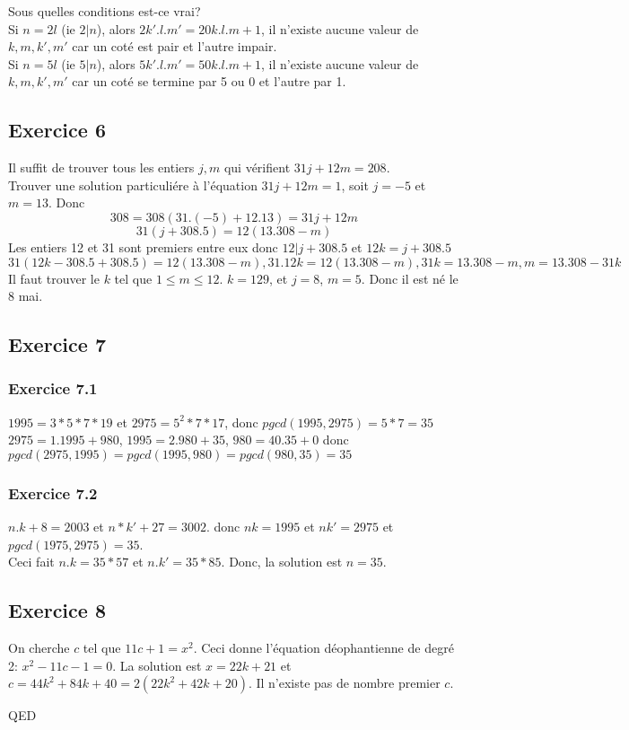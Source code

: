 \documentclass[]{book}
\theoremstyle{definition}
\begin{document}
Sous quelles conditions est-ce vrai?\\
Si $n=2l$ (ie $2|n$), alors $2k'.l.m' = 20k.l.m+1$, il n'existe aucune valeur de $k,m,k',m'$ car un cot\'e est pair et l'autre impair.\\
Si $n=5l$ (ie $5|n$), alors $5k'.l.m' = 50k.l.m+1$, il n'existe aucune valeur de $k,m,k',m'$ car un cot\'e se termine par 5 ou 0 et l'autre par 1.\\


\subsection*{Exercice 6}
Il suffit de trouver tous les entiers $j,m$ qui v\'erifient $31j+12m=208$.\\
Trouver une solution particuli\'ere \`a l'\'equation $31j+12m=1$, soit $j=-5$ et $m=13$. Donc 
$$308 = 308(31.(-5) + 12.13) =  31j + 12m$$
$$31(j+308.5) = 12(13.308-m)$$
Les entiers 12 et 31 sont premiers entre eux donc $12|j+308.5$ et $12k=j+308.5$
$$31(12k-308.5+308.5) = 12(13.308-m), 31.12k=12(13.308-m), 31k = 13.308-m, m=13.308-31k$$
Il faut trouver le $k$ tel que $1\leq m\leq 12$. $k=129$, et $j=8$, $m=5$. Donc il est n\'e le 8 mai.


\subsection*{Exercice 7}
\subsubsection*{Exercice 7.1}
$1995 = 3*5*7*19$ et $2975 = 5^2*7*17$, donc $pgcd(1995,2975) = 5*7 = 35$\\

$2975=1.1995+980$, $1995 = 2.980+35$, $980 = 40.35+0$ donc $pgcd(2975,1995)=pgcd(1995,980)=pgcd(980,35)=35$

\subsubsection*{Exercice 7.2}
$n.k+8 = 2003$ et $n*k' + 27 = 3002$. donc $nk=1995$ et $nk'=2975$ et $pgcd(1975,2975) = 35$.\\
Ceci fait $n.k=35*57$ et $n.k'=35*85$. Donc, la solution est $n=35$.  	
 

\subsection*{Exercice 8}
On cherche $c$ tel que $11c+1 = x^2$. Ceci donne l'\'equation d\'eophantienne de degr\'e 2: $x^2 -11c-1 = 0$.
La solution est $x=22k+21$ et $c=44k^2+84k+40=2(22k^2+42k+20)$. 
Il n'existe pas de nombre premier $c$.

QED
\end{document}

